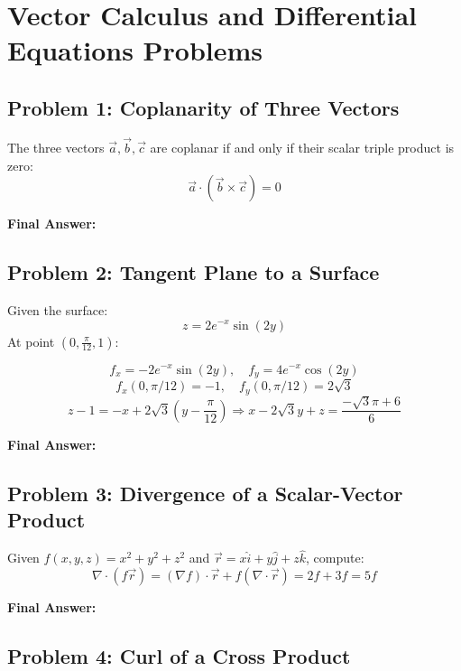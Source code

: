 \documentclass{article}
\begin{document}
\section*{Vector Calculus and Differential Equations Problems}

\subsection*{Problem 1: Coplanarity of Three Vectors}

The three vectors \( \vec{a}, \vec{b}, \vec{c} \) are coplanar if and only if their scalar triple product is zero:
\[
\vec{a} \cdot (\vec{b} \times \vec{c}) = 0
\]

\noindent\textbf{Final Answer: } 

\bigskip

\subsection*{Problem 2: Tangent Plane to a Surface}

Given the surface:
\[
z = 2e^{-x} \sin(2y)
\]
At point \( \left(0, \frac{\pi}{12}, 1\right) \):

\[
f_x = -2e^{-x} \sin(2y), \quad f_y = 4e^{-x} \cos(2y)
\]
\[
f_x(0, \pi/12) = -1, \quad f_y(0, \pi/12) = 2\sqrt{3}
\]
\[
z - 1 = -x + 2\sqrt{3}\left(y - \frac{\pi}{12} \right) \Rightarrow x - 2\sqrt{3}y + z = \frac{-\sqrt{3} \pi + 6}{6}
\]

\noindent\textbf{Final Answer: } 

\bigskip

\subsection*{Problem 3: Divergence of a Scalar-Vector Product}

Given \( f(x,y,z) = x^2 + y^2 + z^2 \) and \( \vec{r} = x\hat{i} + y\hat{j} + z\hat{k} \), compute:
\[
\nabla \cdot (f\vec{r}) = (\nabla f) \cdot \vec{r} + f(\nabla \cdot \vec{r}) = 2f + 3f = 5f
\]

\noindent\textbf{Final Answer: } 

\bigskip

\subsection*{Problem 4: Curl of a Cross Product}
\end{document}
